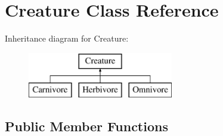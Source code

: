 \hypertarget{class_creature}{}\section{Creature Class Reference}
\label{class_creature}
Inheritance diagram for Creature\+:\begin{figure}[H]
\begin{center}
\leavevmode
\includegraphics[height=2.000000cm]{class_creature}
\end{center}
\end{figure}
\subsection*{Public Member Functions}
